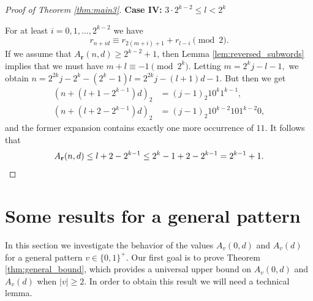 \documentclass[a4paper,11pt]{amsart}
\theoremstyle{definition}
\begin{document}
\begin{proof}[Proof of Theorem \ref{thm:main3}]
\textbf{Case IV:} $3 \cdot 2^{k-2} \leq l < 2^{k}$

For at least $i = 0,1,\ldots, 2^{k-2}$ we have 
$$
r_{n+id} \equiv r_{2(m+i)+1} + r_{l - i} \pmod{2}.
$$
If we assume that $A_{\mathbf{r}}(n,d) \geq 2^{k-2}+1$, then Lemma \ref{lem:reversed_subwords} implies that we must have $m + l \equiv -1 \pmod{2^{k}}.$ Letting $m = 2^k j -l -1,$ we obtain $n = 2^{2k} j -2^k - (2^k-1)l = 2^{2k}j  - (l+1)d -1$. But then we get
\begin{align*}
(n +(l+1-2^{k-1})d)_2 &= (j-1)_2 1 0^{k} 1^{k-1}, \\
(n +(l+2-2^{k-1})d)_2 &= (j-1)_2 1 0^{k-2} 10 1^{k-2} 0,
\end{align*}
and the former expansion contains exactly one more occurrence of $11$. It follows that 
$$A_{\mathbf{r}}(n,d) \leq l+2-2^{k-1} \leq 2^k-1+2-2^{k-1} = 2^{k-1}+1. \qedhere$$
\end{proof}




\section{Some results for a general pattern} \label{sec:general_v}

In this section we investigate the behavior of the values $A_v(0,d)$ and $A_v(d)$ for a general pattern $v \in \{0,1\}^+$. Our first goal is to prove Theorem \ref{thm:general_bound}, which provides a universal upper bound on $A_v(0,d)$ and $A_v(d)$ when $|v| \geq 2$. In order to obtain this result we will need a technical lemma.
\end{document}
